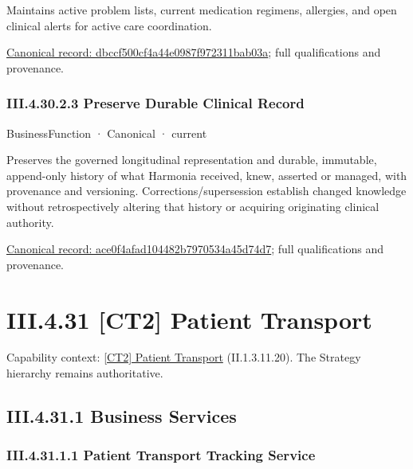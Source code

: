 Maintains active problem lists, current medication regimens, allergies, and open clinical alerts for active care coordination.


{\footnotesize \href{../../../../continuum/business/business-function/dbccf500cf4a44e0987f972311bab03a.md}{Canonical record: dbccf500cf4a44e0987f972311bab03a}; full qualifications and provenance.}\par
\subsubsection*{III.4.30.2.3 Preserve Durable Clinical Record}
\label{navigation:III.4.30.2.3}

\label{element:ace0f4afad104482b7970534a45d74d7}
{\small BusinessFunction · Canonical · current}\par

Preserves the governed longitudinal representation and durable, immutable, append-only history of what Harmonia received, knew, asserted or managed, with provenance and versioning. Corrections/supersession establish changed knowledge without retrospectively altering that history or acquiring originating clinical authority.


{\footnotesize \href{../../../../continuum/business/business-function/ace0f4afad104482b7970534a45d74d7.md}{Canonical record: ace0f4afad104482b7970534a45d74d7}; full qualifications and provenance.}\par
\section*{III.4.31 [CT2] Patient Transport}
\label{navigation:III.4.31}

{\small Capability context: \hyperref[element:6041d7c0cc5d4519aaea584bb4e6d365]{[CT2] Patient Transport} (II.1.3.11.20). The Strategy hierarchy remains authoritative.}\par
\subsection*{III.4.31.1 Business Services}
\label{navigation:III.4.31.1}

\subsubsection*{III.4.31.1.1 Patient Transport Tracking Service}
\label{navigation:III.4.31.1.1}

